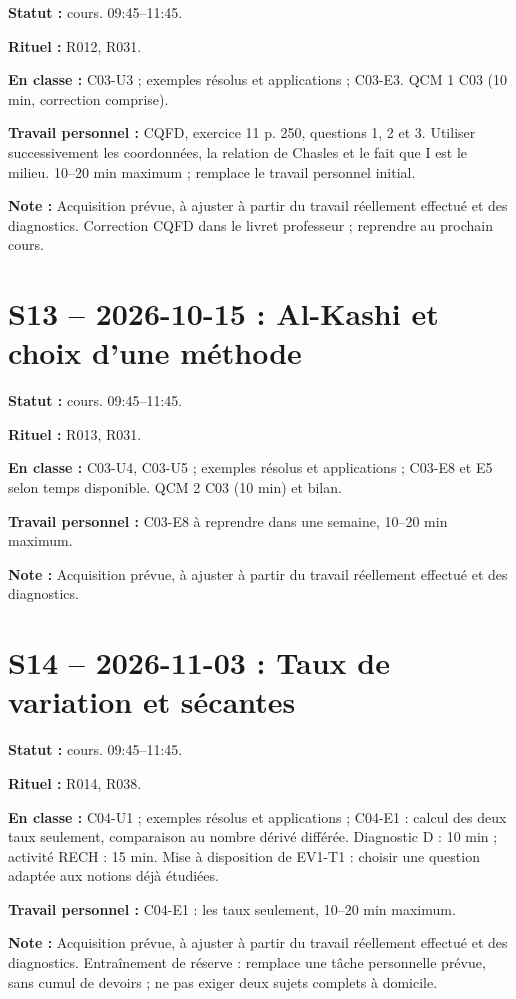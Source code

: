 \textbf{Statut :} cours. 09:45–11:45.\par\textbf{Rituel :} R012, R031.\par\textbf{En classe :} C03-U3 ; exemples résolus et applications ; C03-E3.  QCM 1 C03 (10 min, correction comprise).\par\textbf{Travail personnel :} CQFD, exercice 11 p. 250, questions 1, 2 et 3. Utiliser successivement les coordonnées, la relation de Chasles et le fait que I est le milieu. 10–20 min maximum ; remplace le travail personnel initial.\par\textbf{Note :} Acquisition prévue, à ajuster à partir du travail réellement effectué et des diagnostics. Correction CQFD dans le livret professeur ; reprendre au prochain cours.
\section*{S13 -- 2026-10-15 : Al-Kashi et choix d’une méthode}
\textbf{Statut :} cours. 09:45–11:45.\par\textbf{Rituel :} R013, R031.\par\textbf{En classe :} C03-U4, C03-U5 ; exemples résolus et applications ; C03-E8 et E5 selon temps disponible.  QCM 2 C03 (10 min) et bilan.\par\textbf{Travail personnel :} C03-E8 à reprendre dans une semaine, 10–20 min maximum.\par\textbf{Note :} Acquisition prévue, à ajuster à partir du travail réellement effectué et des diagnostics.
\section*{S14 -- 2026-11-03 : Taux de variation et sécantes}
\textbf{Statut :} cours. 09:45–11:45.\par\textbf{Rituel :} R014, R038.\par\textbf{En classe :} C04-U1 ; exemples résolus et applications ; C04-E1 : calcul des deux taux seulement, comparaison au nombre dérivé différée. Diagnostic D : 10 min ; activité RECH : 15 min. Mise à disposition de EV1-T1 : choisir une question adaptée aux notions déjà étudiées.\par\textbf{Travail personnel :} C04-E1 : les taux seulement, 10–20 min maximum.\par\textbf{Note :} Acquisition prévue, à ajuster à partir du travail réellement effectué et des diagnostics. Entraînement de réserve : remplace une tâche personnelle prévue, sans cumul de devoirs ; ne pas exiger deux sujets complets à domicile.
